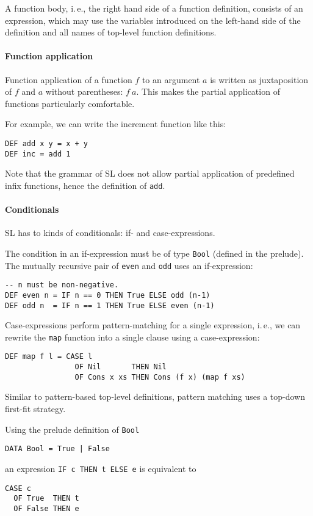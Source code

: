 \documentclass{article}
\begin{document}
A function body, i.\,e., the right hand side of a function definition,
consists of an expression, which may use the variables introduced on
the left-hand side of the definition and all names of top-level
function definitions.


\paragraph{Function application}
\label{sec:function-application}

Function application of a function $f$ to an argument $a$ is written
as juxtaposition of $f$ and $a$ without parentheses: $f\ a$. This
makes the partial application of functions particularly comfortable.

For example, we can write the increment function like this:
\begin{verbatim}
DEF add x y = x + y
DEF inc = add 1
\end{verbatim}
Note that the grammar of SL does not allow partial application of
predefined infix functions, hence the definition of \verb|add|.


\paragraph{Conditionals}
\label{sec:conditionals}

SL has to kinds of conditionals: if- and case-expressions. 

The condition in an if-expression must be of type \verb|Bool| (defined
in the prelude). The mutually recursive pair of \verb|even| and
\verb|odd| uses an if-expression:
\begin{verbatim}
-- n must be non-negative.
DEF even n = IF n == 0 THEN True ELSE odd (n-1)
DEF odd n  = IF n == 1 THEN True ELSE even (n-1)
\end{verbatim}

Case-expressions perform pattern-matching for a single expression,
i.\,e., we can rewrite the \verb|map| function into a single clause
using a case-expression:
\begin{verbatim}
DEF map f l = CASE l
                OF Nil       THEN Nil
                OF Cons x xs THEN Cons (f x) (map f xs)
\end{verbatim}
Similar to pattern-based top-level definitions, pattern matching uses
a top-down first-fit strategy.

Using the prelude definition of \verb|Bool|
\begin{verbatim}
DATA Bool = True | False
\end{verbatim}
an expression \verb|IF c THEN t ELSE e| is equivalent to
\begin{verbatim}
CASE c
  OF True  THEN t 
  OF False THEN e
\end{verbatim}
\end{document}

